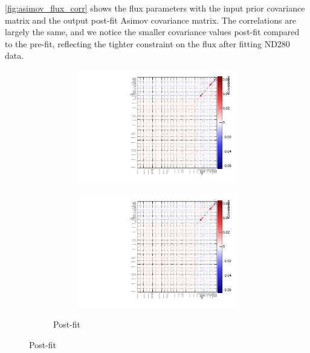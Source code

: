 \autoref{fig:asimov_flux_corr} shows the flux parameters with the input prior covariance matrix and the output post-fit Asimov covariance matrix. The correlations are largely the same, and we notice the smaller covariance values post-fit compared to the pre-fit, reflecting the tighter constraint on the flux after fitting ND280 data.
\begin{figure}[h]
	\begin{subfigure}[t]{\textwidth}
	\begin{subfigure}[t]{0.49\textwidth}
		\includegraphics[width=\textwidth, trim={0mm 0mm 0mm 0mm}, clip,page=8]{figures/mach3/Asimov/2017b_NewDet_NewData_Asimov_Long_0_drawCorr.pdf}
	\end{subfigure}
	\begin{subfigure}[t]{0.49\textwidth}
		\includegraphics[width=\textwidth, trim={0mm 0mm 0mm 0mm}, clip,page=9]{figures/mach3/Asimov/2017b_NewDet_NewData_Asimov_Long_0_drawCorr.pdf}
	\end{subfigure}
\caption{Post-fit}
\end{subfigure}


\end{figure}
